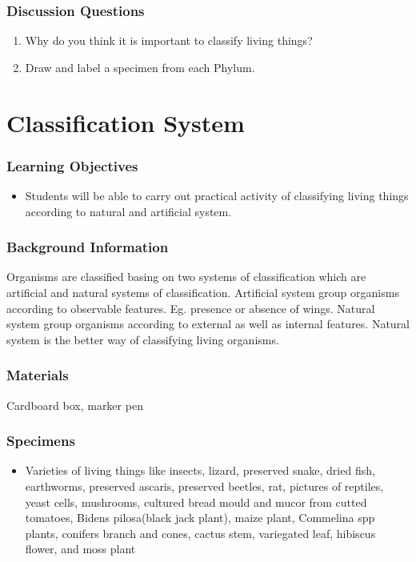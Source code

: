 \subsubsection*{Discussion Questions}
\begin{enumerate}
\item{Why do you think it is important to classify living things?}
\item{Draw and label a specimen from each Phylum.}
\end{enumerate}


\section{Classification System}

\subsubsection*{Learning Objectives}
\begin{itemize}
\item{Students will be able to carry out practical activity of classifying living things according to natural and artificial system.}
\end{itemize}

\subsubsection*{Background Information}
Organisms are classified basing on two systems of classification which are artificial and natural systems of classification. Artificial system group organisms according to observable features. Eg. presence or absence of wings. Natural system group organisms according to external as well as internal features. Natural system is the better way of classifying living organisms.

\subsubsection*{Materials}
Cardboard box, marker pen

\subsubsection*{Specimens}
\begin{itemize}
\item{Varieties of living things like insects, lizard, preserved snake, dried fish, earthworms, preserved ascaris, preserved beetles, rat, pictures of reptiles, yeast cells, mushrooms, cultured bread mould and mucor from cutted tomatoes, Bidens pilosa(black jack plant), maize plant, Commelina spp plants, conifers branch and cones, cactus stem, variegated leaf, hibiscus flower, and moss plant}
\end{itemize}

